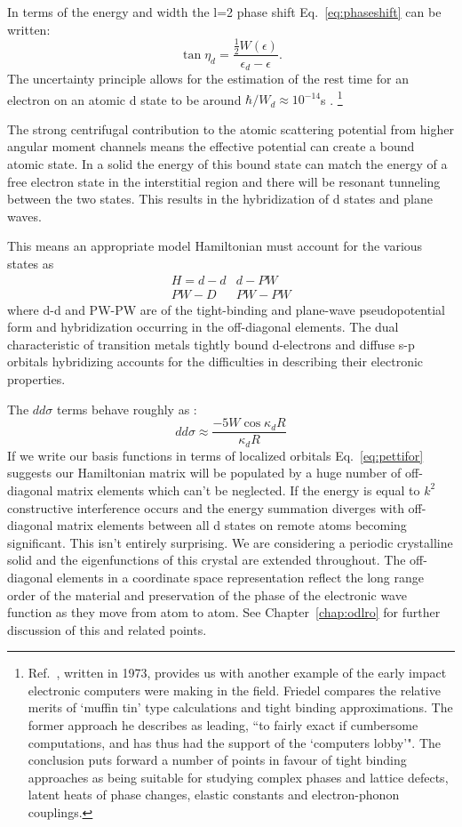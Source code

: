 In terms of the energy and width the l=2 phase shift Eq.~\ref{eq:phaseshift} 
can be written:
%
\begin{equation}
\label{eq:dshift}
\tan \eta_{d} = \frac{\frac{1}{2}W(\epsilon)}{\epsilon_{d}-\epsilon}.
\end{equation}
%
The uncertainty principle allows for the estimation of the rest
time for an electron on an atomic d state to be around $\hbar/W_{d}\approx 10^{-14}$s \cite{friedel73}.
\footnote{Ref.~\cite{friedel73}, written in 1973, provides us with another example
of the early impact electronic computers were making in the field. Friedel  compares 
the relative merits of `muffin tin' type calculations and tight binding approximations.
The former approach he describes as leading, ``to fairly exact if cumbersome
computations, and has thus had the support of the `computers lobby'". The conclusion
puts forward a number of points in favour of tight binding approaches as 
being suitable for studying complex phases and lattice defects,
latent heats of phase changes, elastic constants and electron-phonon couplings.}

The strong centrifugal contribution to the
atomic scattering potential from higher angular moment channels means the effective potential
can create a bound atomic state. In a solid the energy of this bound state can match the 
energy of a free electron state in the interstitial region and there will
be resonant tunneling between the two states. This results in the hybridization of d states
and plane waves. 

This means an appropriate model Hamiltonian must account for the various states as
%
\begin{eqnarray}
\label{eq:d-hamiltonian}
H =  d-d  &  d-PW \\
     PW-D & PW-PW 
\end{eqnarray}
%
where d-d and PW-PW are of the tight-binding and plane-wave 
pseudopotential form and hybridization occurring in the 
off-diagonal elements. The dual characteristic of transition metals
tightly bound d-electrons and diffuse s-p orbitals hybridizing 
accounts for the difficulties in describing their electronic properties.


The $dd\sigma$ terms behave roughly as \cite{pettifor71}:
%
\begin{equation}
\label{eq:pettifor}
dd\sigma \approx \frac{-5W\cos\kappa_{d}R}{\kappa_{d}R}
\end{equation}
%
If we write our basis functions in terms of localized orbitals
Eq.~\ref{eq:pettifor} suggests our Hamiltonian matrix will be 
populated by a huge number of off-diagonal matrix elements which can't be neglected. If 
the energy is equal to $k^{2}$ constructive interference occurs and the energy summation
diverges with off-diagonal matrix elements between all d states on remote atoms becoming
significant. This isn't entirely surprising. We are considering a periodic crystalline solid
and the eigenfunctions of this crystal are extended throughout. The off-diagonal elements
in a coordinate space representation reflect the long range order of the material and
preservation of the phase of the electronic wave function as they move from atom to atom. See
Chapter~\ref{chap:odlro} for further discussion of this and related points.


